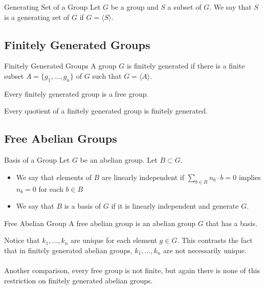 \documentclass[a4paper]{article}
\begin{document}
\begin{defn}{Generating Set of a Group}{} Let $G$ be a group and $S$ a subset of $G$. We say that $S$ is a generating set of $G$ if $G=\langle S\rangle$. 
\end{defn}

\subsection{Finitely Generated Groups}
\begin{defn}{Finitely Generated Groups}{} A group $G$ is finitely generated if there is a finite subset $A=\{g_1,\dots,g_n\}$ of $G$ such that $G=\langle A\rangle$. 
\end{defn}

\begin{lmm}{}{} Every finitely generated group is a free group. 
\end{lmm}

\begin{prp}{}{} Every quotient of a finitely generated group is finitely generated. 
\end{prp}

\subsection{Free Abelian Groups}
\begin{defn}{Basis of a Group}{} Let $G$ be an abelian group. Let $B\subset G$. 
\begin{itemize}
\item We say that elements of $B$ are linearly independent if $\sum_{b\in B}n_b\cdot b=0$ implies $n_b=0$ for each $b\in B$
\item We say that $B$ is a basis of $G$ if it is linearly independent and generate $G$. 
\end{itemize}
\end{defn}

\begin{defn}{Free Abelian Group}{} A free abelian group is an abelian group $G$ that has a basis. 
\end{defn}

Notice that $k_1,\dots,k_n$ are unique for each element $g\in G$. This contrasts the fact that in finitely generated abelian groups, $k_1,\dots,k_n$ are not necessarily unique. \\~\\
Another comparison, every free group is not finite, but again there is none of this restriction on finitely generated abelian groups. 
\end{document}
